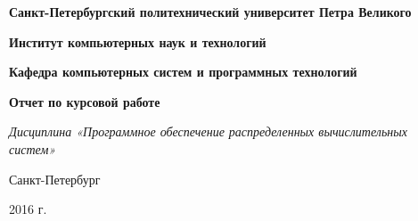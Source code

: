\begin{titlepage}
 \centerline{\bf Санкт-Петербургский политехнический университет Петра Великого}
 \centerline{\bf Институт компьютерных наук и технологий}
 \centerline{\bf Кафедра компьютерных систем и программных технологий}
 \vskip 5cm
{\large \centerline{\bf Отчет по курсовой работе}
 \centerline{\it Дисциплина «Программное обеспечение распределенных вычислительных систем»}}
 \vskip 1cm
 {\Large {\bf
} }

\vskip 3.9cm 
\vskip 0.1cm 

\vspace{0.5cm}

\vskip 0.1cm 

\vskip 5cm 
\centerline{Санкт-Петербург}

\centerline{2016 г.}

\end{titlepage}

